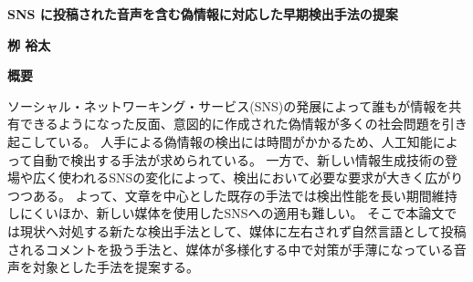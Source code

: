 



\thispagestyle{plain}
\cleardoublepage
%
%

\begin{center}
    \Large
    \textbf{SNS に投稿された音声を含む偽情報に対応した早期検出手法の提案}
        
    \vspace{0.4cm}
    \textbf{栁 裕太}
       
    \vspace{0.9cm}
    \textbf{概要}
   
\end{center}

ソーシャル・ネットワーキング・サービス(SNS)の発展によって誰もが情報を共有できるようになった反面、意図的に作成された偽情報が多くの社会問題を引き起こしている。
人手による偽情報の検出には時間がかかるため、人工知能によって自動で検出する手法が求められている。
一方で、新しい情報生成技術の登場や広く使われるSNSの変化によって、検出において必要な要求が大きく広がりつつある。
よって、文章を中心とした既存の手法では検出性能を長い期間維持しにくいほか、新しい媒体を使用したSNSへの適用も難しい。
そこで本論文では現状へ対処する新たな検出手法として、媒体に左右されず自然言語として投稿されるコメントを扱う手法と、媒体が多様化する中で対策が手薄になっている音声を対象とした手法を提案する。

